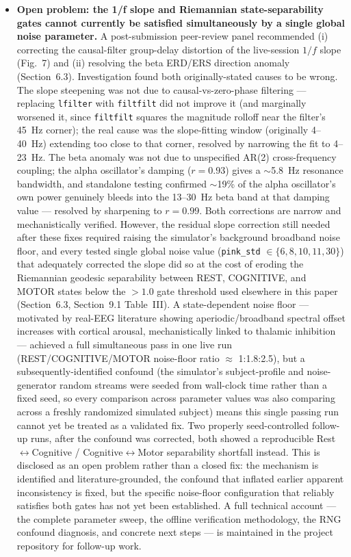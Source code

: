 \documentclass[11pt]{article}
\newcommand{\code}[1]{\texttt{#1}}
\begin{document}
\begin{itemize}[leftmargin=*]
\item \textbf{Open problem: the 1/f slope and Riemannian state-separability gates cannot currently be satisfied simultaneously by a single global noise parameter.} A post-submission peer-review panel recommended (i) correcting the causal-filter group-delay distortion of the live-session $1/f$ slope (Fig.~7) and (ii) resolving the beta ERD/ERS direction anomaly (Section~6.3). Investigation found both originally-stated causes to be wrong. The slope steepening was not due to causal-vs-zero-phase filtering --- replacing \code{lfilter} with \code{filtfilt} did not improve it (and marginally worsened it, since \code{filtfilt} squares the magnitude rolloff near the filter's 45~Hz corner); the real cause was the slope-fitting window (originally 4--40~Hz) extending too close to that corner, resolved by narrowing the fit to 4--23~Hz. The beta anomaly was not due to unspecified AR(2) cross-frequency coupling; the alpha oscillator's damping ($r=0.93$) gives a $\sim$5.8~Hz resonance bandwidth, and standalone testing confirmed $\sim$19\% of the alpha oscillator's own power genuinely bleeds into the 13--30~Hz beta band at that damping value --- resolved by sharpening to $r=0.99$. Both corrections are narrow and mechanistically verified. However, the residual slope correction still needed after these fixes required raising the simulator's background broadband noise floor, and every tested single global noise value (\code{pink\_std} $\in \{6,8,10,11,30\}$) that adequately corrected the slope did so at the cost of eroding the Riemannian geodesic separability between REST, COGNITIVE, and MOTOR states below the $>1.0$ gate threshold used elsewhere in this paper (Section~6.3, Section~9.1 Table~III). A state-dependent noise floor --- motivated by real-EEG literature showing aperiodic/broadband spectral offset increases with cortical arousal, mechanistically linked to thalamic inhibition~\cite{miller2009,manning2009,borah2025} --- achieved a full simultaneous pass in one live run (REST/COGNITIVE/MOTOR noise-floor ratio $\approx$ 1:1.8:2.5), but a subsequently-identified confound (the simulator's subject-profile and noise-generator random streams were seeded from wall-clock time rather than a fixed seed, so every comparison across parameter values was also comparing across a freshly randomized simulated subject) means this single passing run cannot yet be treated as a validated fix. Two properly seed-controlled follow-up runs, after the confound was corrected, both showed a reproducible Rest$\leftrightarrow$Cognitive / Cognitive$\leftrightarrow$Motor separability shortfall instead. This is disclosed as an open problem rather than a closed fix: the mechanism is identified and literature-grounded, the confound that inflated earlier apparent inconsistency is fixed, but the specific noise-floor configuration that reliably satisfies both gates has not yet been established. A full technical account --- the complete parameter sweep, the offline verification methodology, the RNG confound diagnosis, and concrete next steps --- is maintained in the project repository for follow-up work.
\end{itemize}
\end{document}
